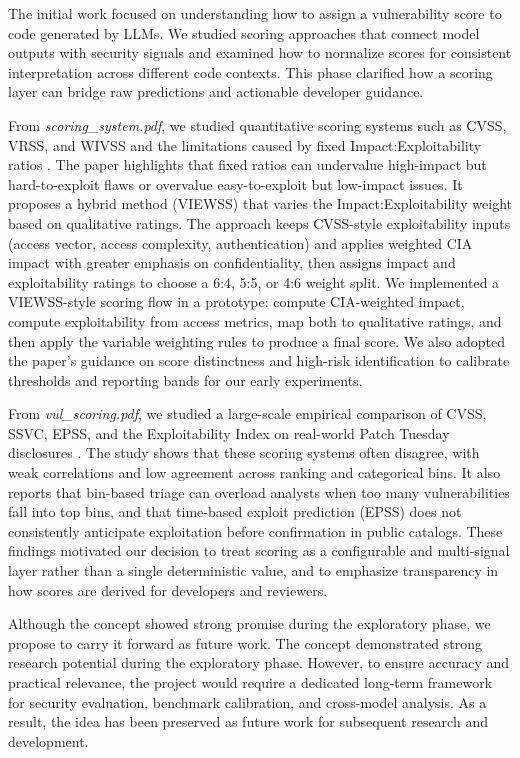 The initial work focused on understanding how to assign a vulnerability score to code generated by LLMs. We studied scoring approaches that connect model outputs with security signals and examined how to normalize scores for consistent interpretation across different code contexts. This phase clarified how a scoring layer can bridge raw predictions and actionable developer guidance.

From \textit{scoring_system.pdf}, we studied quantitative scoring systems such as CVSS, VRSS, and WIVSS and the limitations caused by fixed Impact:Exploitability ratios \cite{viewss2023}. The paper highlights that fixed ratios can undervalue high-impact but hard-to-exploit flaws or overvalue easy-to-exploit but low-impact issues. It proposes a hybrid method (VIEWSS) that varies the Impact:Exploitability weight based on qualitative ratings. The approach keeps CVSS-style exploitability inputs (access vector, access complexity, authentication) and applies weighted CIA impact with greater emphasis on confidentiality, then assigns impact and exploitability ratings to choose a 6:4, 5:5, or 4:6 weight split. We implemented a VIEWSS-style scoring flow in a prototype: compute CIA-weighted impact, compute exploitability from access metrics, map both to qualitative ratings, and then apply the variable weighting rules to produce a final score. We also adopted the paper's guidance on score distinctness and high-risk identification to calibrate thresholds and reporting bands for our early experiments.

From \textit{vul_scoring.pdf}, we studied a large-scale empirical comparison of CVSS, SSVC, EPSS, and the Exploitability Index on real-world Patch Tuesday disclosures \cite{koscinski2025}. The study shows that these scoring systems often disagree, with weak correlations and low agreement across ranking and categorical bins. It also reports that bin-based triage can overload analysts when too many vulnerabilities fall into top bins, and that time-based exploit prediction (EPSS) does not consistently anticipate exploitation before confirmation in public catalogs. These findings motivated our decision to treat scoring as a configurable and multi-signal layer rather than a single deterministic value, and to emphasize transparency in how scores are derived for developers and reviewers.

Although the concept showed strong promise during the exploratory phase, we propose to carry it forward as future work. The concept demonstrated strong research potential during the exploratory phase. However, to ensure accuracy and practical relevance, the project would require a dedicated long-term framework for security evaluation, benchmark calibration, and cross-model analysis. As a result, the idea has been preserved as future work for subsequent research and development.

